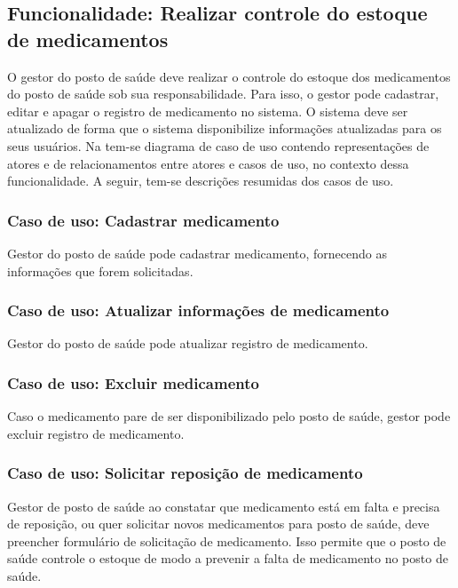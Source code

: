 %


\subsection{Funcionalidade: Realizar controle do estoque de medicamentos}

%

O gestor do posto de saúde deve realizar o controle do estoque dos medicamentos do posto de saúde sob sua responsabilidade. Para isso, o gestor pode cadastrar, editar e apagar o registro de medicamento no sistema. O sistema deve ser atualizado de forma que o sistema disponibilize informações atualizadas para os seus usuários. Na  tem-se diagrama de caso de uso contendo representações de atores e de relacionamentos entre atores e casos de uso, no contexto dessa funcionalidade. A seguir, tem-se descrições resumidas dos casos de uso.

\subsubsection{Caso de uso: Cadastrar medicamento}

Gestor do posto de saúde pode cadastrar medicamento, fornecendo as informações que forem solicitadas.

\subsubsection{Caso de uso: Atualizar informações de medicamento}

Gestor do posto de saúde pode atualizar registro de medicamento.

\subsubsection{Caso de uso: Excluir medicamento}

Caso o medicamento pare de ser disponibilizado pelo posto de saúde, gestor pode excluir registro de medicamento.

\subsubsection{Caso de uso: Solicitar reposição de medicamento}
Gestor de posto de saúde ao constatar que medicamento está em falta e precisa de reposição, ou quer solicitar novos medicamentos para posto de saúde, deve preencher formulário de solicitação de medicamento. Isso permite que o posto de saúde controle o estoque de modo a prevenir a falta de medicamento no posto de saúde.

